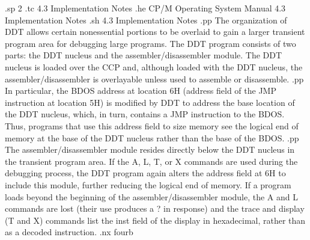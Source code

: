.sp 2
.tc    4.3  Implementation Notes
.he CP/M Operating System Manual            4.3  Implementation Notes
.sh
4.3  Implementation Notes
.pp
The organization of DDT allows certain nonessential portions to 
be overlaid to gain a larger transient program area for debugging 
large programs.  The DDT program consists of two parts:  the DDT 
nucleus and the assembler/disassembler module.  The DDT nucleus 
is loaded over the CCP and, although loaded with the DDT nucleus, 
the assembler/disassembler is overlayable unless used to assemble 
or disassemble.
.pp
In particular, the BDOS address at location 6H (address field of 
the JMP instruction at location 5H) is modified by DDT to address 
the base location of the DDT nucleus, which, in turn, contains a 
JMP instruction to the BDOS.  Thus, programs that use this 
address field to size memory see the logical end of memory at the 
base of the DDT nucleus rather than the base of the BDOS.
.pp
The assembler/disassembler module resides directly below the DDT 
nucleus in the transient program area.  If the A, L, T, or X 
commands are used during the debugging process, the DDT program 
again alters the address field at 6H to include this module, 
further reducing the logical end of memory.  If a program loads 
beyond the beginning of the assembler/disassembler module, the A 
and L commands are lost (their use produces a ? in response) 
and the trace and display (T and X) commands list the inst field 
of the display in hexadecimal, rather than as a decoded 
instruction.
.nx fourb



